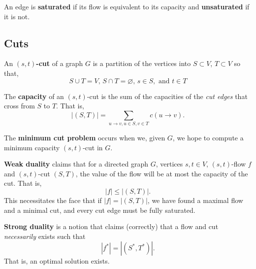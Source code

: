 \documentclass[titlepage, 12pt, leqno]{article}
\begin{document}
\begin{definition}
    An edge is \textbf{saturated} if its flow is equivalent to its capacity and
    \textbf{unsaturated} if it is not.
\end{definition}

\pagebreak

\subsection{Cuts}

\begin{definition}
    An \textbf{$(s,t)$-cut} of a graph $G$ is a partition of the vertices into
    $S \subset V$, $T \subset V$ so that,
    \[
        S \cup T = V \text{, }S \cap T = \varnothing \text{, } 
        s \in S, \text{ and } t \in T
    \]
\end{definition}

\begin{definition}
    The \textbf{capacity} of an $(s,t)$-cut is the sum of the capacities of the
    \textit{cut edges} that cross from $S$ to $T$. That is,
    \[
        |(S,T)| = \sum_{u\rightarrow v, u \in S, v \in T}c(u\rightarrow v).
    \]
\end{definition}

\begin{definition}
    The \textbf{minimum cut problem} occurs when we, given $G$, we hope to
    compute a minimum capacity $(s,t)$-cut in $G$.
\end{definition}

\begin{definition}
    \textbf{Weak duality} claims that for a directed graph $G$, vertices
    $s,t \in V$, $(s,t)$-flow $f$ and $(s,t)$-cut $(S,T)$, the value of the
    flow will be at most the capacity of the cut. That is,
    \[
        |f| \le |(S,T)|.
    \]
    This necessitates the face that if $|f| = |(S,T)|$, we have found a
    maximal flow and a minimal cut, and every cut edge must be fully saturated.
\end{definition}

\begin{definition}
    \textbf{Strong duality} is a notion that claims (correctly) that a 
    flow and cut \textit{necessarily} exists such that
    \[
        |f^{*}| = |(S^{*}, T^{*})|.
    \]
    That is, an optimal solution exists.
\end{definition}

\pagebreak
\end{document}
